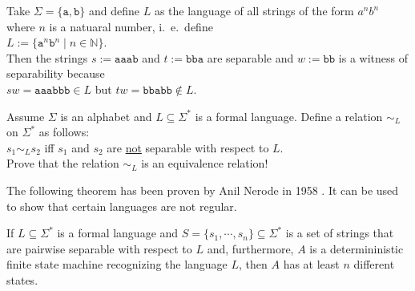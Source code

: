 \exampleEng
 Take $\Sigma = \{ \mathtt{a}, \mathtt{b} \}$ and define $L$ as the
language of all strings of the form $a^nb^n$ where $n$ is a natuaral number, i.~e.~define
\\[0.2cm]
\hspace*{1.3cm}
$L := \{ \mathtt{a}^n\mathtt{b}^n \mid n \in \mathbb{N} \}$.
\\[0.2cm]
Then the strings $s := \texttt{aaab}$ and $t := \texttt{bba}$ are separable and
$w := \mathtt{bb}$ is a witness of separability because
\\[0.2cm]
\hspace*{1.3cm}
$sw = \mathtt{aaabbb} \in L$ \quad but \quad $tw = \mathtt{bbabb} \not\in L$.  \eox

\exerciseEng
Assume $\Sigma$ is an alphabet and $L \subseteq \Sigma^*$ is a formal language.  Define a
relation $\sim_L$ on $\Sigma^*$ as follows:
\\[0.2cm]
\hspace*{1.3cm}
$s_1 \sim_L s_2$ 
\quad iff \quad $s_1$ and $s_2$ are \underline{not} separable with respect to $L$.
\\[0.2cm]
Prove that the relation $\sim_L$ is an equivalence relation!  \eox
\vspace*{0.3cm}


\noindent
The following theorem has been proven by Anil Nerode in 1958 \cite{nerode:58}. 
It can be used to show that certain languages are not regular.

\begin{Theorem}[Nerode]
  If $L \subseteq \Sigma^*$ is a formal language and $S = \{ s_1, \cdots, s_n \} \subseteq \Sigma^*$
  is a set of strings that are pairwise separable with respect to $L$ and, furthermore, $A$ is a 
  determininistic finite state machine recognizing the language $L$, then
  $A$ has at least $n$ different states.
\end{Theorem}

